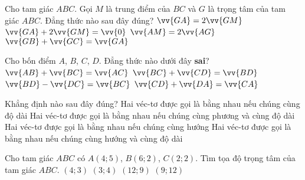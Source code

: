 \begin{ex}%
Cho tam giác $ABC$. Gọi $M$ là trung điểm của $BC$ và $G$ là trọng tâm của tam giác $ABC$. Đẳng thức nào sau đây đúng?
\choice
{$\vv{GA}=2\vv{GM}$}
{\True $\vv{GA}+2\vv{GM}=\vv{0}$}
{$\vv{AM}=2\vv{AG}$}
{$\vv{GB}+\vv{GC}=\vv{GA}$}
\end{ex}
\begin{ex}%
Cho bốn điểm $A$, $B$, $C$, $D$. Đẳng thức nào dưới đây \textbf{sai}?
\choice
{$\vv{AB}+\vv{BC}=\vv{AC}$}
{$\vv{BC}+\vv{CD}=\vv{BD}$}
{\True $\vv{BD}-\vv{DC}=\vv{BC}$}
{$\vv{CD}+\vv{DA}=\vv{CA}$}
\end{ex}
\begin{ex}%
Khẳng định nào sau đây đúng?
\choice
{Hai véc-tơ được gọi là bằng nhau nếu chúng cùng độ dài}
{Hai véc-tơ được gọi là bằng nhau nếu chúng cùng phương và cùng độ dài}
{Hai véc-tơ được gọi là bằng nhau nếu chúng cùng hướng}
{\True Hai véc-tơ được gọi là bằng nhau nếu chúng cùng hướng và cùng độ dài}
\end{ex}
\begin{ex}%
Cho tam giác $ABC$ có $A(4;5)$, $B(6;2)$, $C(2;2)$. Tìm tọa độ trọng tâm của tam giác $ABC$.
\choice
{\True $(4;3)$}
{$(3;4)$}
{$(12;9)$}
{$(9;12)$}
\end{ex}


